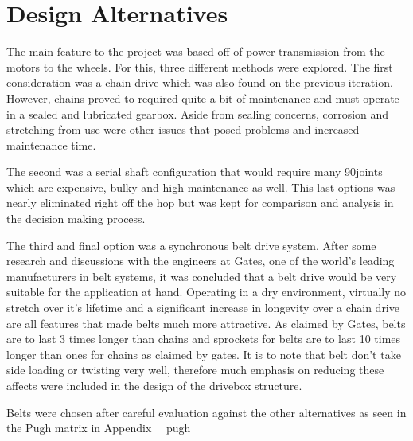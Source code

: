 \usepackage{gensymbol}
\section {Design Alternatives}
The main feature to the project was based off of power transmission from the motors to the wheels. For this, three different methods were explored. The first consideration was a chain drive which was also found on the previous iteration. However, chains proved to required quite a bit of maintenance and must operate in a sealed and lubricated gearbox. Aside from sealing concerns, corrosion and stretching from use were other issues that posed problems and increased maintenance time. 

The second was a serial shaft configuration that would require many 90\degree joints which are expensive, bulky and high maintenance as well. This last options was nearly eliminated right off the hop but was kept for comparison and analysis in the decision making process. 

The third and final option was a synchronous belt drive system. After some research and discussions with the engineers at Gates, one of the world's leading manufacturers in belt systems, it was concluded that a belt drive would be very suitable for the application at hand. Operating in a dry environment, virtually no stretch over it's lifetime and a significant increase in longevity over a chain drive are all features that made belts much more attractive. As claimed by Gates, belts are to last 3 times longer than chains and sprockets for belts are to last 10 times longer than ones for chains as claimed by gates. It is to note that belt don't take side loading or twisting very well, therefore much emphasis on reducing these affects were included in the design of the drivebox structure. 

Belts were chosen after careful evaluation against the other alternatives as seen in the Pugh matrix in Appendix ~\REF~{pugh}





